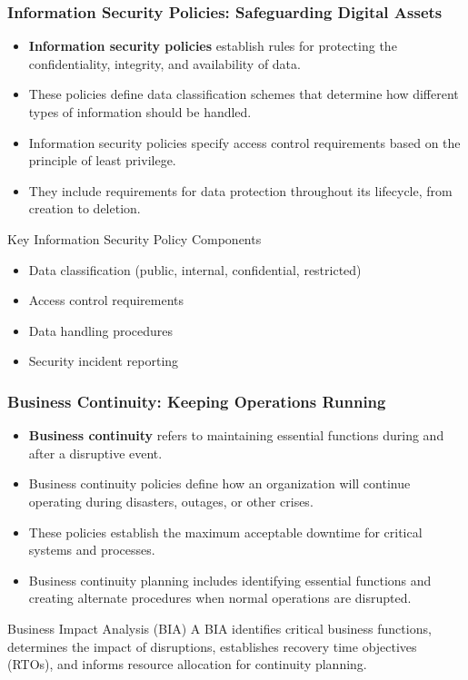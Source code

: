 \documentclass{beamer}
\begin{document}
\begin{frame}
\frametitle{Information Security Policies: Safeguarding Digital Assets}
\begin{itemize}
\item \textbf{Information security policies} establish rules for protecting the confidentiality, integrity, and availability of data.
\item These policies define data classification schemes that determine how different types of information should be handled.
\item Information security policies specify access control requirements based on the principle of least privilege.
\item They include requirements for data protection throughout its lifecycle, from creation to deletion.
\end{itemize}

\begin{block}{Key Information Security Policy Components}
\small
\begin{itemize}
\item Data classification (public, internal, confidential, restricted)
\item Access control requirements
\item Data handling procedures
\item Security incident reporting
\end{itemize}
\end{block}
\end{frame}

\begin{frame}
\frametitle{Business Continuity: Keeping Operations Running}
\begin{itemize}
\item \textbf{Business continuity} refers to maintaining essential functions during and after a disruptive event.
\item Business continuity policies define how an organization will continue operating during disasters, outages, or other crises.
\item These policies establish the maximum acceptable downtime for critical systems and processes.
\item Business continuity planning includes identifying essential functions and creating alternate procedures when normal operations are disrupted.
\end{itemize}

\begin{alertblock}{Business Impact Analysis (BIA)}
A BIA identifies critical business functions, determines the impact of disruptions, establishes recovery time objectives (RTOs), and informs resource allocation for continuity planning.
\end{alertblock}
\end{frame}
\end{document}
